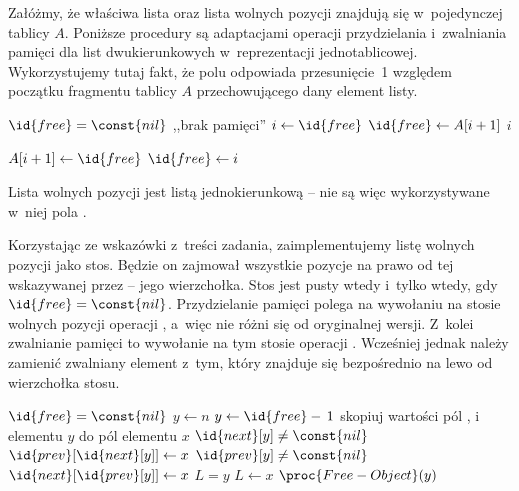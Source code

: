 \exercise %
Załóżmy, że właściwa lista oraz lista wolnych pozycji znajdują się w~pojedynczej tablicy $A$. Poniższe procedury są adaptacjami operacji przydzielania i~zwalniania pamięci dla list dwukierunkowych w~reprezentacji jednotablicowej. Wykorzystujemy tutaj fakt, że polu  odpowiada przesunięcie~1 względem początku fragmentu tablicy $A$ przechowującego dany element listy.
\begin{codebox}
\li	\If $\id{free}=\const{nil}$
\li		\Then \Error ,,brak pamięci''
		\End
\li	$i\gets\id{free}$
\li	$\id{free}\gets A[i+1]$
\li	\Return $i$
\end{codebox}

\begin{codebox}
\li	$A[i+1]\gets\id{free}$
\li	$\id{free}\gets i$
\end{codebox}

\exercise %
Lista wolnych pozycji jest listą jednokierunkową -- nie są więc wykorzystywane w~niej pola .

\exercise %
Korzystając ze wskazówki z~treści zadania, zaimplementujemy listę wolnych pozycji jako stos. Będzie on zajmował wszystkie pozycje na prawo od tej wskazywanej przez  -- jego wierzchołka. Stos jest pusty wtedy i~tylko wtedy, gdy $\id{free}=\const{nil}$. Przydzielanie pamięci polega na wywołaniu na stosie wolnych pozycji operacji , a~więc nie różni się od oryginalnej wersji. Z~kolei zwalnianie pamięci to wywołanie na tym stosie operacji . Wcześniej jednak należy zamienić zwalniany element z~tym, który znajduje się bezpośrednio na lewo od wierzchołka stosu.
\begin{codebox}
\li	\If $\id{free}=\const{nil}$
\li		\Then $y\gets n$
\li		\Else $y\gets\id{free}-\,1$
		\End
\li	skopiuj wartości pól ,  i~ elementu $y$ do pól elementu $x$
\li	\If $\id{next}[y]\ne\const{nil}$
\li		\Then $\id{prev}[\id{next}[y]]\gets x$
		\End
\li	\If $\id{prev}[y]\ne\const{nil}$
\li		\Then $\id{next}[\id{prev}[y]]\gets x$
		\End
\li	\If $L=y$
\li		\Then $L\gets x$
		\End
\li	$\proc{Free-Object}(y)$
\end{codebox}

